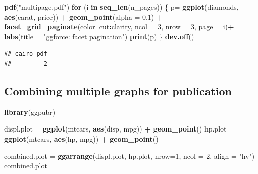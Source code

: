 \documentclass[]{krantz}
\makeatletter
\newenvironment{Shaded}{\begin{snugshade}}{\end{snugshade}}
\newcommand{\ControlFlowTok}[1]{\textcolor[rgb]{0.13,0.29,0.53}{\textbf{#1}}}
\newcommand{\DataTypeTok}[1]{\textcolor[rgb]{0.13,0.29,0.53}{#1}}
\newcommand{\DecValTok}[1]{\textcolor[rgb]{0.00,0.00,0.81}{#1}}
\newcommand{\FloatTok}[1]{\textcolor[rgb]{0.00,0.00,0.81}{#1}}
\newcommand{\KeywordTok}[1]{\textcolor[rgb]{0.13,0.29,0.53}{\textbf{#1}}}
\newcommand{\NormalTok}[1]{#1}
\newcommand{\OperatorTok}[1]{\textcolor[rgb]{0.81,0.36,0.00}{\textbf{#1}}}
\newcommand{\StringTok}[1]{\textcolor[rgb]{0.31,0.60,0.02}{#1}}
\newenvironment{kframe}{%
\medskip{}
\setlength{\fboxsep}{.8em}
 \def\at@end@of@kframe{}%
 \ifinner\ifhmode%
  \def\at@end@of@kframe{\end{minipage}}%
  \begin{minipage}{\columnwidth}%
 \fi\fi%
 \def\FrameCommand##1{\hskip\@totalleftmargin \hskip-\fboxsep
 \colorbox{shadecolor}{##1}\hskip-\fboxsep
     \hskip-\linewidth \hskip-\@totalleftmargin \hskip\columnwidth}%
 \MakeFramed {\advance\hsize-\width
   \@totalleftmargin\z@ \linewidth\hsize
   \@setminipage}}%
 {\par\unskip\endMakeFramed%
 \at@end@of@kframe}
\renewenvironment{Shaded}{\begin{kframe}}{\end{kframe}}
\makeatother
\begin{document}
\begin{Shaded}
\begin{Highlighting}[]
\KeywordTok{pdf}\NormalTok{(}\StringTok{"multipage.pdf"}\NormalTok{)}
  \ControlFlowTok{for}\NormalTok{ (i }\ControlFlowTok{in} \KeywordTok{seq_len}\NormalTok{(n_pages)) \{}
\NormalTok{    p=}\StringTok{  }\KeywordTok{ggplot}\NormalTok{(diamonds, }\KeywordTok{aes}\NormalTok{(carat, price)) }\OperatorTok{+}
\StringTok{          }\KeywordTok{geom_point}\NormalTok{(}\DataTypeTok{alpha =} \FloatTok{0.1}\NormalTok{) }\OperatorTok{+}
\StringTok{          }\KeywordTok{facet_grid_paginate}\NormalTok{(color}\OperatorTok{~}\NormalTok{cut}\OperatorTok{:}\NormalTok{clarity, }\DataTypeTok{ncol =} \DecValTok{3}\NormalTok{, }\DataTypeTok{nrow =} \DecValTok{3}\NormalTok{, }\DataTypeTok{page =}\NormalTok{ i)}\OperatorTok{+}
\StringTok{        }\KeywordTok{labs}\NormalTok{(}\DataTypeTok{title =} \StringTok{"ggforce: facet pagination"}\NormalTok{)}
    \KeywordTok{print}\NormalTok{(p)}
\NormalTok{\}}
\KeywordTok{dev.off}\NormalTok{()}
\end{Highlighting}
\end{Shaded}

\begin{verbatim}
## cairo_pdf 
##         2
\end{verbatim}

\hypertarget{combining-multiple-graphs-for-publication}{%
\subsection{Combining multiple graphs for publication}\label{combining-multiple-graphs-for-publication}}

\begin{Shaded}
\begin{Highlighting}[]
\KeywordTok{library}\NormalTok{(ggpubr)}

\NormalTok{displ.plot =}\StringTok{ }\KeywordTok{ggplot}\NormalTok{(mtcars, }\KeywordTok{aes}\NormalTok{(disp, mpg)) }\OperatorTok{+}\StringTok{ }\KeywordTok{geom_point}\NormalTok{()}
\NormalTok{hp.plot =}\StringTok{ }\KeywordTok{ggplot}\NormalTok{(mtcars, }\KeywordTok{aes}\NormalTok{(hp, mpg)) }\OperatorTok{+}\StringTok{ }\KeywordTok{geom_point}\NormalTok{()}

\NormalTok{combined.plot =}\StringTok{ }\KeywordTok{ggarrange}\NormalTok{(displ.plot, hp.plot, }\DataTypeTok{nrow=}\DecValTok{1}\NormalTok{, }\DataTypeTok{ncol =} \DecValTok{2}\NormalTok{, }\DataTypeTok{align =} \StringTok{"hv"}\NormalTok{)}
\NormalTok{combined.plot}
\end{Highlighting}
\end{Shaded}
\end{document}
